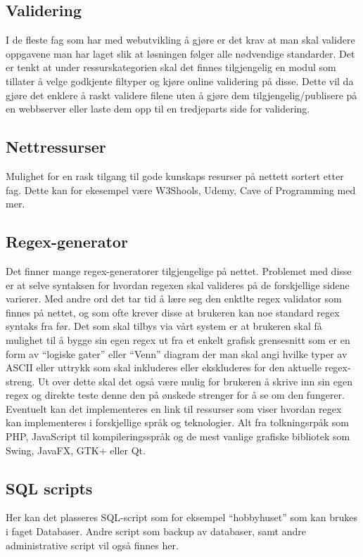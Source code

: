 \subsection{Validering}
I de fleste fag som har med webutvikling å gjøre er det krav at man skal validere oppgavene  man har laget slik at løsningen følger alle nødvendige standarder. Det er tenkt at under ressurskategorien skal det finnes tilgjengelig en modul som tillater å velge godkjente filtyper og kjøre online validering på disse. Dette vil da gjøre det enklere å raskt validere filene uten å  gjøre dem tilgjengelig/publisere på en webbserver eller laste dem opp til en tredjeparts side for validering.

\subsection{Nettressurser}
Mulighet for en rask tilgang til gode kunskaps resurser på nettett sortert etter fag. Dette kan for ekesempel være W3Shools, Udemy, Cave of Programming med mer.

\subsection{Regex-generator}
Det finner mange regex-generatorer tilgjengelige på nettet. Problemet med disse er at selve syntaksen for hvordan regexen skal valideres på de forskjellige sidene varierer. Med andre ord det tar tid å lære seg den enktlte regex validator som finnes på nettet, og som ofte krever disse at brukeren kan noe standard regex syntaks fra før. Det som skal tilbys via vårt system er at brukeren skal få mulighet til å bygge sin egen regex ut fra et enkelt grafisk grensesnitt som er en form av “logiske gater” eller “Venn” diagram der man skal angi hvilke typer av ASCII eller uttrykk som skal inkluderes eller ekskluderes for den aktuelle regex-streng. Ut over dette skal det også være mulig for brukeren å skrive inn sin egen regex og direkte teste denne den på ønskede strenger for å se om den fungerer. Eventuelt kan det implementeres en link til ressurser som viser hvordan regex kan implementeres i forskjellige språk og teknologier. Alt fra tolkningsrpåk som PHP, JavaScript til kompileringsspråk og de mest vanlige grafiske bibliotek som Swing, JavaFX, GTK+ eller Qt.

\subsection{SQL scripts}
Her kan det plasseres SQL-script som for eksempel “hobbyhuset” som kan brukes i faget Databaser. Andre script som backup av databaser, samt andre administrative script vil også finnes her.


